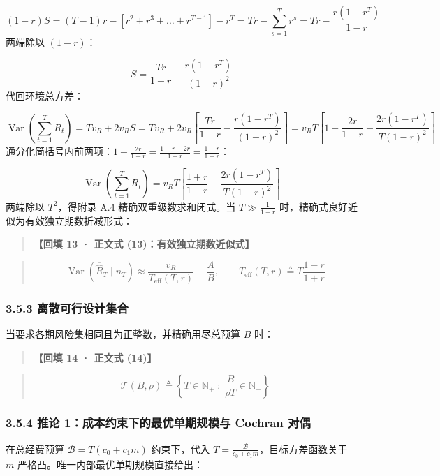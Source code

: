 \documentclass[11pt,a4paper]{ctexart}
\begin{document}
\[
(1-r)S = (T-1)r - \left[ r^2 + r^3 + \dots + r^{T-1} \right] - r^T = T r - \sum_{s=1}^T r^s = T r - \frac{r(1 - r^T)}{1 - r}
\]
两端除以 $(1-r)$：

\[
S = \frac{T r}{1 - r} - \frac{r(1 - r^T)}{(1 - r)^2}
\]
代回环境总方差：

\[
\operatorname{Var}\left(\sum_{t=1}^T R_t\right) = T v_R + 2 v_R S = T v_R + 2 v_R \left[ \frac{T r}{1 - r} - \frac{r(1 - r^T)}{(1 - r)^2} \right] = v_R T \left[ 1 + \frac{2r}{1-r} - \frac{2r(1 - r^T)}{T(1-r)^2} \right]
\]
通分化简括号内前两项：$1 + \frac{2r}{1-r} = \frac{1-r+2r}{1-r} = \frac{1+r}{1-r}$：

\[
\operatorname{Var}\left(\sum_{t=1}^T R_t\right) = v_R T \left[ \frac{1+r}{1-r} - \frac{2r(1 - r^T)}{T(1-r)^2} \right]
\]
两端除以 $T^2$，得附录 A.4 精确双重级数求和闭式。当 $T \gg \frac{1}{1-r}$ 时，精确式良好近似为有效独立期数折减形式：


\begin{quote}\small\color{black!75}
\textbf{【回填 13 · 正文式 (13)：有效独立期数近似式】}
\end{quote}
\begin{quote}\small\color{black!75}
\begin{equation*}
\operatorname{Var}(\overline{\widehat{R}}_T \mid n_T) \approx \frac{v_R}{T_{\operatorname{eff}}(T, r)} + \frac{A}{B}, \qquad T_{\operatorname{eff}}(T, r) \triangleq T \frac{1-r}{1+r} \tag{eq:var\_budget\_ar1}
\end{equation*}
\end{quote}

\subsubsection{3.5.3 离散可行设计集合}
当要求各期风险集相同且为正整数，并精确用尽总预算 $B$ 时：


\begin{quote}\small\color{black!75}
\textbf{【回填 14 · 正文式 (14)】}
\end{quote}
\begin{quote}\small\color{black!75}
\begin{equation*}
\mathcal{T}(B, \rho) \triangleq \left\{ T \in \mathbb{N}_+ \;:\; \frac{B}{\rho T} \in \mathbb{N}_+ \right\} \tag{eq:feasible\_T}
\end{equation*}
\end{quote}

\subsubsection{3.5.4 推论 1：成本约束下的最优单期规模与 Cochran 对偶}
在总经费预算 $\mathcal{B} = T(c_0 + c_1 m)$ 约束下，代入 $T = \frac{\mathcal{B}}{c_0 + c_1 m}$，目标方差函数关于 $m$ 严格凸。唯一内部最优单期规模直接给出：
\end{document}
